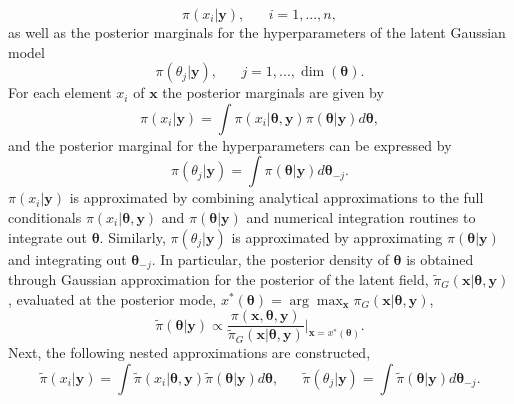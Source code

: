 \documentclass[12pt]{book}
\begin{document}
\begin{equation*}
    \pi\left(x_i|\pmb{y}\right),\hspace{20pt}i=1,...,n,
\end{equation*}
as well as the posterior marginals for the hyperparameters of the latent Gaussian model
\begin{equation*}
    \pi\left(\theta_j|\pmb{y}\right),\hspace{20pt}j=1,...,\dim\left(\pmb{\theta}\right).
\end{equation*}
For each element $x_i$ of $\pmb{x}$ the posterior marginals are given by
\begin{equation}
    \pi\left(x_i|\pmb{y}\right)=\int\pi\left(x_i|\pmb{\theta},\pmb{y}\right)\pi\left(\pmb{\theta}|\pmb{y}\right)d\pmb{\theta},
\end{equation}
and the posterior marginal for the hyperparameters can be expressed by
\begin{equation}
    \pi\left(\theta_j|\pmb{y}\right)=\int\pi\left(\pmb{\theta}|\pmb{y}\right)d\pmb{\theta}_{-j}.
\end{equation}
$\pi\left(x_i|\pmb{y}\right)$ is approximated by combining analytical approximations to the full conditionals $\pi\left(x_i|\pmb{\theta},\pmb{y}\right)$ and $\pi\left(\pmb{\theta}|\pmb{y}\right)$ and numerical integration routines to integrate out $\pmb{\theta}$. Similarly, $\pi\left(\theta_j|\pmb{y}\right)$ is approximated by approximating $\pi\left(\pmb{\theta}|\pmb{y}\right)$ and integrating out $\pmb{\theta}_{-j}$. In particular, the posterior density of $\pmb{\theta}$ is obtained through Gaussian approximation for the posterior of the latent field, $\widetilde{\pi}_G\left(\pmb{x}|\pmb{\theta},\pmb{y}\right)$, evaluated at the posterior mode, $x^*\left(\pmb{\theta}\right)=\arg\max_{\pmb{x}}\pi_G\left(\pmb{x}|\pmb{\theta},\pmb{y}\right)$,
\begin{equation}
    \widetilde{\pi}\left(\pmb{\theta}|\pmb{y}\right)\propto\frac{\pi\left(\pmb{x},\pmb{\theta},\pmb{y}\right)}{\widetilde{\pi}_G\left(\pmb{x}|\pmb{\theta},\pmb{y}\right)}\bigg|_{\pmb{x}=x^*\left(\pmb{\theta}\right)}.
\end{equation}
Next, the following nested approximations are constructed,
\begin{equation}
    \widetilde{\pi}\left(x_i|\pmb{y}\right)=\int\widetilde{\pi}\left(x_i|\pmb{\theta},\pmb{y}\right)\widetilde{\pi}\left(\pmb{\theta}|\pmb{y}\right)d\pmb{\theta},\hspace{20pt}\widetilde{\pi}\left(\theta_j|\pmb{y}\right)=\int\widetilde{\pi}\left(\pmb{\theta}|\pmb{y}\right)d\pmb{\theta}_{-j}.
\end{equation}
\end{document}

